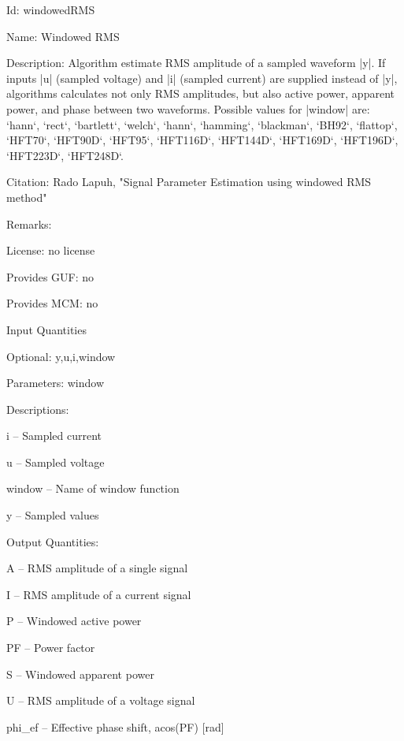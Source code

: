 \begin{tightdesc}
\item [Id:] windowedRMS
\item [Name:] Windowed RMS
\item [Description:] Algorithm estimate RMS amplitude of a sampled waveform |y|. If inputs |u| (sampled voltage) and |i| (sampled current) are supplied instead of |y|, algorithms calculates not only RMS amplitudes, but also active power, apparent power, and phase between two waveforms. Possible values for |window| are: `hann`, `rect`, `bartlett`, `welch`, `hann`, `hamming`, `blackman`, `BH92`, `flattop`, `HFT70`, `HFT90D`, `HFT95`, `HFT116D`, `HFT144D`, `HFT169D`, `HFT196D`, `HFT223D`, `HFT248D`.
\item [Citation:] Rado Lapuh, "Signal Parameter Estimation using windowed RMS method"
\item [Remarks:] 
\item [License:] no license
\item [Provides GUF:] no
\item [Provides MCM:] no
\item [Input Quantities] \rule{0em}{0em}
    \begin{tightdesc}
    \item [Optional:] 
        \textsf{y},\enspace \textsf{u},\enspace \textsf{i},\enspace \textsf{window}
    \item [Parameters:] 
        \textsf{window}
    \item [Descriptions:] \rule{0em}{0em}
        \begin{tightdesc}
            \item[\textsf{i}] -- Sampled current
            \item[\textsf{u}] -- Sampled voltage
            \item[\textsf{window}] -- Name of window function
            \item[\textsf{y}] -- Sampled values
        \end{tightdesc}
    \end{tightdesc}
\item [Output Quantities:] \rule{0em}{0em}
    \begin{tightdesc}
        \item[\textsf{A}] -- RMS amplitude of a single signal
        \item[\textsf{I}] -- RMS amplitude of a current signal
        \item[\textsf{P}] -- Windowed active power
        \item[\textsf{PF}] -- Power factor
        \item[\textsf{S}] -- Windowed apparent power
        \item[\textsf{U}] -- RMS amplitude of a voltage signal
        \item[\textsf{phi\_ef}] -- Effective phase shift, acos(PF) [rad]
    \end{tightdesc}
\end{tightdesc}
